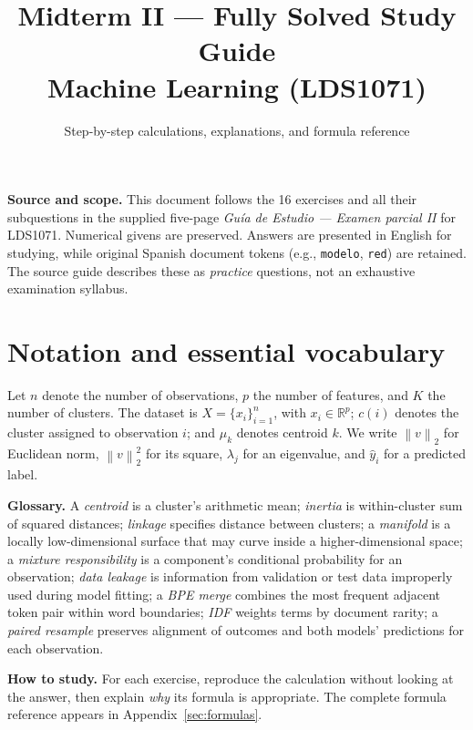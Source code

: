 \documentclass[11pt]{article}
\title{\textbf{Midterm II --- Fully Solved Study Guide}\\[2mm]\large Machine Learning (LDS1071)}
\author{Step-by-step calculations, explanations, and formula reference}
\date{}
\newcommand{\R}{\mathbb R}
\newcommand{\norm}[1]{\left\lVert#1\right\rVert}
\begin{document}
\maketitle
\begin{concept}
\textbf{Source and scope.} This document follows the 16 exercises and all their subquestions in the supplied five-page \emph{Gu\'ia de Estudio --- Examen parcial II} for LDS1071. Numerical givens are preserved. Answers are presented in English for studying, while original Spanish document tokens (e.g., \texttt{modelo}, \texttt{red}) are retained. The source guide describes these as \emph{practice} questions, not an exhaustive examination syllabus.
\end{concept}
\tableofcontents
\clearpage

\section*{Notation and essential vocabulary}
Let $n$ denote the number of observations, $p$ the number of features, and $K$ the number of clusters. The dataset is $X=\{x_i\}_{i=1}^{n}$, with $x_i\in\R^p$; $c(i)$ denotes the cluster assigned to observation $i$; and $\mu_k$ denotes centroid $k$. We write $\norm{v}_2$ for Euclidean norm, $\norm{v}_2^2$ for its square, $\lambda_j$ for an eigenvalue, and $\hat y_i$ for a predicted label.

\textbf{Glossary.} A \emph{centroid} is a cluster's arithmetic mean; \emph{inertia} is within-cluster sum of squared distances; \emph{linkage} specifies distance between clusters; a \emph{manifold} is a locally low-dimensional surface that may curve inside a higher-dimensional space; a \emph{mixture responsibility} is a component's conditional probability for an observation; \emph{data leakage} is information from validation or test data improperly used during model fitting; a \emph{BPE merge} combines the most frequent adjacent token pair within word boundaries; \emph{IDF} weights terms by document rarity; a \emph{paired resample} preserves alignment of outcomes and both models' predictions for each observation.

\begin{important}
\textbf{How to study.} For each exercise, reproduce the calculation without looking at the answer, then explain \emph{why} its formula is appropriate. The complete formula reference appears in Appendix~\ref{sec:formulas}.
\end{important}
\clearpage
\end{document}
